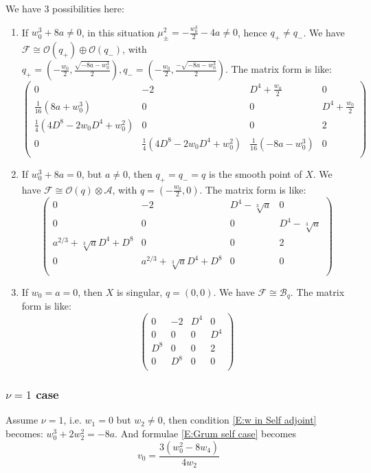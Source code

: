 \documentclass[11pt]{article}
\theoremstyle{definition}
\theoremstyle{plain}
\numberwithin{equation}{section}
\begin{document}
We have 3 possibilities here:
\begin{enumerate}
	\item If $w_0^3+8a\neq 0$, in this situation $\mu_{\pm}^2=-\frac{w_0^3}{2}-4a\neq 0$, hence $q_{+}\neq q_{-}$. We have $\mathcal{F}\cong \mathcal{O}(q_+)\oplus\mathcal{O}(q_-)$, with $q_+=(-\frac{w_0}{2},\frac{\sqrt{-8a-w_0^3}}{2}),q_-=(-\frac{w_0}{2},\frac{-\sqrt{-8a-w_0^3}}{2})$. The matrix form is like:
	$$
	\left(
	\begin{array}{cccc}
		0 & -2 & D^4+\frac{w_0}{2} & 0 \\
		\frac{1}{16} (8 a+w_0^3) & 0 & 0 & D^4+\frac{w_0}{2} \\
		\frac{1}{4} ( 4D^8-2 w_0D^4+w_0^2)& 0 & 0 & 2 \\
		0 & \frac{1}{4} \left(4 D^8-2 w_0D^4 +w_0^2\right) & \frac{1}{16} \left(-8 a-w_0^3\right) & 0 \\
	\end{array}
	\right)
	$$
	\item If $w_0^3+8a=0$, but $a\neq 0$, then $q_+=q_-=q$ is the smooth point of $X$. We have $\mathcal{F}\cong \mathcal{O}(q)\otimes \mathcal{A}$, with $q=(-\frac{w_0}{2},0)$. The matrix form is like:
	$$
	\left(
	\begin{array}{cccc}
		0 & -2 & D^4-\sqrt[3]{a} & 0 \\
		0 & 0 & 0 & D^4-\sqrt[3]{a} \\
		a^{2/3}+\sqrt[3]{a} D^4+D^8 & 0 & 0 & 2 \\
		0 & a^{2/3}+\sqrt[3]{a} D^4+D^8 & 0 & 0 \\
	\end{array}
	\right)
	$$
	\item If $w_0=a=0$, then $X$ is singular, $q=(0,0)$. We have $\mathcal{F}\cong \mathcal{B}_{q}$. The matrix form is like:
	$$
	\left(
	\begin{array}{cccc}
		0 & -2 & D^4 & 0 \\
		0 & 0 & 0 & D^4 \\
		D^8 & 0 & 0 & 2 \\
		0 & D^8 & 0 & 0 \\
	\end{array}
	\right)
	$$ 
\end{enumerate}

\subsubsection{$\nu=1$ case}
\label{S:nu1}

Assume $\nu=1$, i.e. $w_1=0$ but $w_2\neq 0$, then  condition \eqref{E:w in Self adjoint} becomes:
$w_0^3+2 w_2^2=-8a$. And  formulae \eqref{E:Grum self case} becomes 
$$
v_0=\frac{3 (w_0^2-8 w_4)}{4 w_2}
$$
\end{document}
